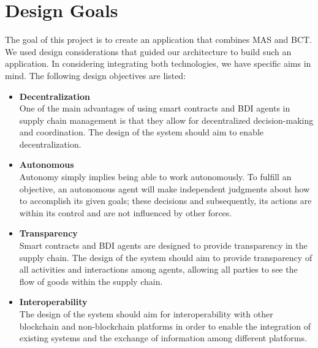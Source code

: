 \section{Design Goals}

The goal of this project is to create an application that combines \ac{MAS} and \ac{BCT}. We used design considerations that guided our architecture to build such an application.
In considering integrating both technologies, we have specific aims in mind. The following design objectives are listed:
\vspace{.5cm}
\begin{itemize}

    \item \textbf{Decentralization} \\ One of the main advantages of using smart contracts and \ac{BDI} agents in supply chain management is that they allow for decentralized decision-making and coordination. The design of the system should aim to enable decentralization.

    \vspace{.5cm}
    
    \item \textbf{Autonomous} \\Autonomy simply implies being able to work autonomously. To fulfill an objective, an autonomous agent will make independent judgments about how to accomplish its given goals; these decisions and subsequently, its actions are within its control and are not influenced by other forces.

    \vspace{.5cm}

    \item \textbf{Transparency} \\ Smart contracts and \ac{BDI} agents are designed to provide transparency in the supply chain. The design of the system should aim to provide transparency of all activities and interactions among agents, allowing all parties to see the flow of goods within the supply chain.

    
    \vspace{.5cm}

    \item \textbf{Interoperability} \\ The design of the system should aim for interoperability with other blockchain and non-blockchain platforms in order to enable the integration of existing systems and the exchange of information among different platforms.


\end{itemize}
